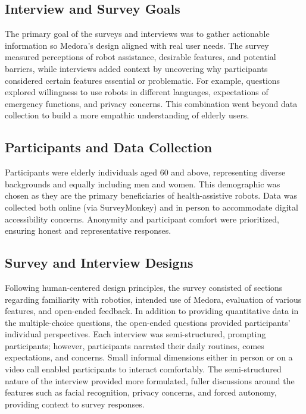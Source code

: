\subsection{Interview and Survey Goals}

The primary goal of the surveys and interviews was to gather actionable information so Medora’s design aligned with real user needs. The survey measured perceptions of robot assistance, desirable features, and potential barriers, while interviews added context by uncovering why participants considered certain features essential or problematic. For example, questions explored willingness to use robots in different languages, expectations of emergency functions, and privacy concerns. This combination went beyond data collection to build a more empathic understanding of elderly users.

\subsection{Participants and Data Collection}

Participants were elderly individuals aged 60 and above, representing diverse backgrounds and equally including men and women. This demographic was chosen as they are the primary beneficiaries of health-assistive robots. Data was collected both online (via SurveyMonkey) and in person to accommodate digital accessibility concerns. Anonymity and participant comfort were prioritized, ensuring honest and representative responses.

\subsection{Survey and Interview Designs}

Following human-centered design principles, the survey consisted of sections regarding familiarity with robotics, intended use of Medora, evaluation of various features, and open-ended feedback. In addition to providing quantitative data in the multiple-choice questions, the open-ended questions provided participants' individual perspectives. Each interview was semi-structured, prompting participants; however, participants narrated their daily routines, comes expectations, and concerns. Small informal dimensions either in person or on a video call enabled participants to interact comfortably. The semi-structured nature of the interview provided more formulated, fuller discussions around the features such as facial recognition, privacy concerns, and forced autonomy, providing context to survey responses.


